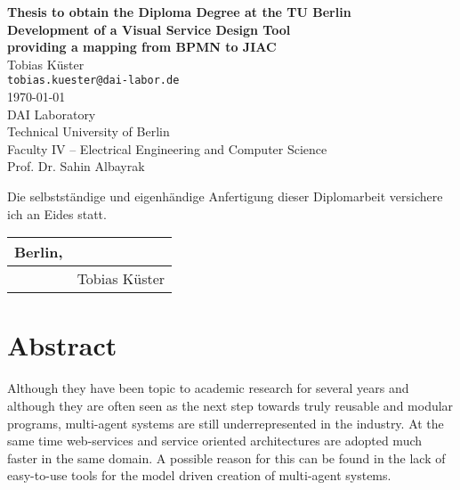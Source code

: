 \begin{titlepage}
\begin{center}
\large \textbf{Thesis to obtain the Diploma Degree at the TU Berlin} \\
\vspace{2.0cm}
\Large \textbf{Development of a Visual Service Design Tool \\ providing a mapping from BPMN to JIAC} \\
\normalsize
\vspace{3.0cm}
Tobias Küster \\
\texttt{tobias.kuester@dai-labor.de}\\
\vspace{1.5cm}
\today \\
\vspace{3.0cm}
DAI Laboratory \\
Technical University of Berlin \\
Faculty IV -- Electrical Engineering and Computer Science \\
Prof. Dr. Sahin Albayrak \\
\end{center}
\end{titlepage}



\vspace{2cm}

Die selbstständige und eigenhändige Anfertigung dieser Diplomarbeit versichere ich an Eides statt.

\vspace{2cm}

\begin{tabular}{p{5cm}p{5cm}}
Berlin,  & \\
\hline
        & \multicolumn{1}{c}{Tobias Küster}
\end{tabular}
\newpage



\section*{Abstract}

Although they have been topic to academic research for several years and although they are often seen as the next step towards truly reusable and modular programs, multi-agent systems are still underrepresented in the industry. At the same time web-services and service oriented architectures are adopted much faster in the same domain. A possible reason for this can be found in the lack of easy-to-use tools for the model driven creation of multi-agent systems.

